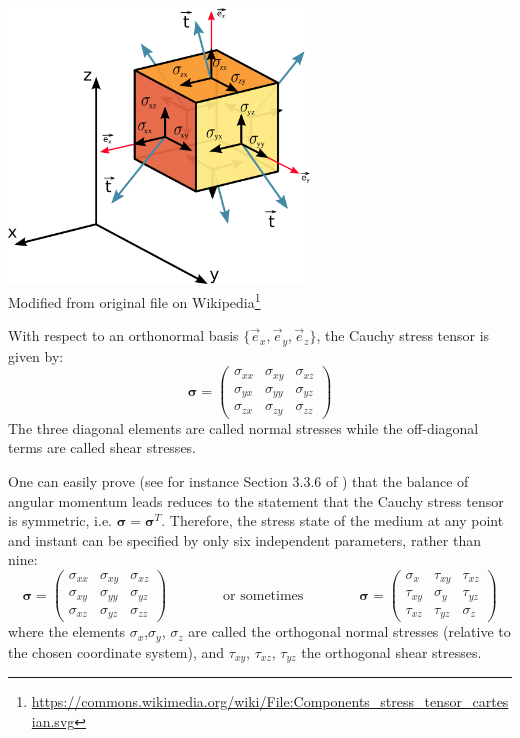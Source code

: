 \begin{center}
\includegraphics[width=8cm]{images/contmech/Components_stress_tensor_cartesian}\\
{\scriptsize Modified from original 
file on Wikipedia\footnote{\url{https://commons.wikimedia.org/wiki/File:Components_stress_tensor_cartesian.svg}}}
\end{center}

With respect to an orthonormal basis $\{\vec{e}_x,\vec{e}_y,\vec{e}_z\}$, the Cauchy stress tensor
is given by:
\begin{equation}
{\bm \sigma}=
\left(
\begin{array}{ccc}
\sigma_{xx} & \sigma_{xy} & \sigma_{xz} \\
\sigma_{yx} & \sigma_{yy} & \sigma_{yz} \\
\sigma_{zx} & \sigma_{zy} & \sigma_{zz} 
\end{array}
\right)
\end{equation}
The three diagonal elements are called normal stresses while the off-diagonal terms 
are called shear stresses.

One can easily prove (see for instance Section 3.3.6 of \cite{grbl09}) that the balance 
of angular momentum leads reduces to the statement that the Cauchy stress tensor 
is symmetric, i.e. ${\bm \sigma}={\bm \sigma}^T$.
Therefore, the stress state of the medium at any point and instant can be specified by only six independent parameters, rather than nine:
\begin{equation}
{\bm \sigma}=
\left(
\begin{array}{ccc}
\sigma_{xx} & \sigma_{xy} & \sigma_{xz} \\
\sigma_{xy} & \sigma_{yy} & \sigma_{yz} \\
\sigma_{xz} & \sigma_{yz} & \sigma_{zz} 
\end{array}
\right)
\qquad\qquad
\text{or sometimes}
\qquad\qquad
{\bm \sigma}=
\left(
\begin{array}{ccc}
\sigma_{x}  & \tau_{xy}  & \tau_{xz} \\
\tau_{xy}   & \sigma_{y} & \tau_{yz} \\
\tau_{xz}   & \tau_{yz}  & \sigma_{z} 
\end{array}
\right)
\end{equation}
where the elements $\sigma _{x}$,$\sigma _{y}$, $\sigma _{z}$ are called the orthogonal 
normal stresses (relative to the chosen coordinate system), and $\tau _{xy}$, $\tau _{xz}$,
$\tau _{yz}$ the orthogonal shear stresses.

